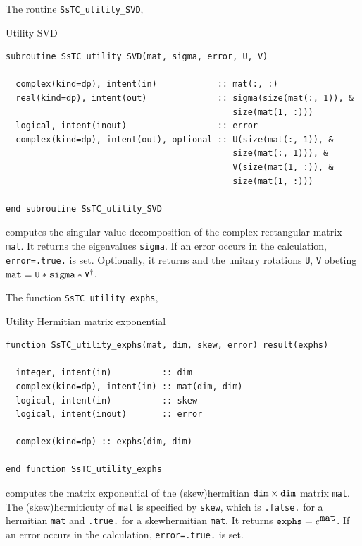 \documentclass[10pt,a4paper]{article}
\begin{document}
The routine \verb|SsTC_utility_SVD|,
\begin{codebox}{Utility SVD}
\begin{lstlisting}[caption={Interface of ``utility SVD".},captionpos=b]
subroutine SsTC_utility_SVD(mat, sigma, error, U, V)

  complex(kind=dp), intent(in)            :: mat(:, :)
  real(kind=dp), intent(out)              :: sigma(size(mat(:, 1)), &
                                             size(mat(1, :)))
  logical, intent(inout)                  :: error
  complex(kind=dp), intent(out), optional :: U(size(mat(:, 1)), &
                                             size(mat(:, 1))), &
                                             V(size(mat(1, :)), &              
                                             size(mat(1, :)))
                                             
end subroutine SsTC_utility_SVD
\end{lstlisting}
\end{codebox}
computes the singular value decomposition of the complex rectangular matrix \verb|mat|. It returns the eigenvalues \verb|sigma|. If an error occurs in the calculation, \verb|error=.true.| is set. Optionally, it returns and the unitary rotations \verb|U|, \verb|V| obeting $\verb|mat|= \verb|U|*\verb|sigma|*\verb|V|^{\dagger}$.

The function \verb|SsTC_utility_exphs|,
\begin{codebox}{Utility Hermitian matrix exponential}
\begin{lstlisting}[caption={Interface of ``utility exponential of matrix".},captionpos=b]
function SsTC_utility_exphs(mat, dim, skew, error) result(exphs)

  integer, intent(in)          :: dim
  complex(kind=dp), intent(in) :: mat(dim, dim)
  logical, intent(in)          :: skew
  logical, intent(inout)       :: error
  
  complex(kind=dp) :: exphs(dim, dim)
  
end function SsTC_utility_exphs
\end{lstlisting}
\end{codebox}
computes the matrix exponential of the (skew)hermitian $\verb|dim|\times\verb|dim|$ matrix \verb|mat|. The (skew)hermiticuty of \verb|mat| is specified by \verb|skew|, which is \verb|.false.| for a hermitian \verb|mat| and \verb|.true.| for a skewhermitian \verb|mat|. It returns $\verb|exphs| = e^{\verb|mat|}$. If an error occurs in the calculation, \verb|error=.true.| is set.
\end{document}
